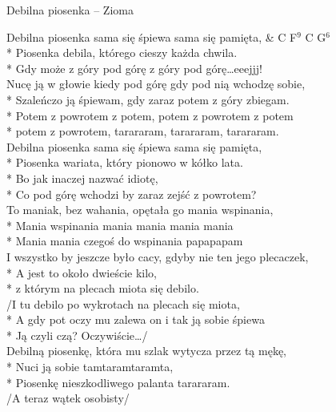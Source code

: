 \begin{piosenka_dluga}[-10mm]{Debilna piosenka -- Zioma}

Debilna piosenka sama się śpiewa sama się pamięta, & C F$^9$ C G$^6$ \\*
Piosenka debila, którego cieszy każda chwila. \\*
Gdy może z góry pod górę z góry pod górę\ldots eeejjj! \\[\zwrotkaspace]

Nucę ją w głowie kiedy pod górę gdy pod nią wchodzę sobie, \\*
Szaleńczo ją śpiewam, gdy zaraz potem z góry zbiegam. \\*
Potem z powrotem z potem, potem z powrotem z potem \\*
potem z powrotem, tarararam, tarararam, tarararam. \\[\zwrotkaspace]

Debilna piosenka sama się śpiewa sama się pamięta, \\*
Piosenka wariata, który pionowo w kółko lata. \\*
Bo jak inaczej nazwać idiotę, \\*
Co pod górę wchodzi by zaraz zejść z powrotem? \\
To maniak, bez wahania, opętała go mania wspinania, \\*
Mania wspinania mania mania mania mania  \\*
Mania mania czegoś do wspinania papapapam \\[\zwrotkaspace]

I wszystko by jeszcze było cacy, gdyby nie ten jego plecaczek,  \\*
A jest to około dwieście kilo, \\*
z którym na plecach miota się debilo. \\[\zwrotkaspace]

/I tu debilo po wykrotach na plecach się miota, \\*
A gdy pot oczy mu zalewa on i tak ją sobie śpiewa \\*
Ją czyli czą? Oczywiście\ldots / \\[\zwrotkaspace]

Debilną piosenkę, która mu szlak wytycza przez tą mękę, \\*
Nuci ją sobie tamtaramtaramta, \\*
Piosenkę nieszkodliwego palanta tarararam. \\[\zwrotkaspace]

/A teraz wątek osobisty/ \\[\zwrotkaspace]


\end{piosenka_dluga}
